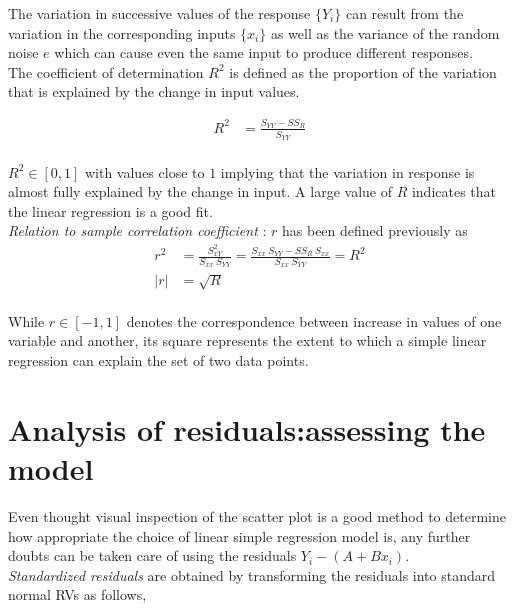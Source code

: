 The variation in successive values of the response $ \{Y_i\} $ can result from the variation in the corresponding inputs $ \{x_i\} $ as well as the variance of the random noise $ e $ which can cause even the same input to produce different responses.\\

The coefficient of determination $ R^2 $ is defined as the proportion of the variation that is explained by the change in input values.

\begin{align}
	R^2 &= \frac{S_{YY} - SS_R}{S_{YY}}
\end{align}\\

$ R^2 \in [0, 1] $ with values close to $ 1 $ implying that the variation in response is almost fully explained by the change in input. A large value of $ R $ indicates that the linear regression is a good fit.\\


\textit{Relation to sample correlation coefficient} : $ r $ has been defined previously as \\

\begin{align}
	r^2 &= \frac{S^2_{xY}}{S_{xx}\ S_{YY}} = \frac{S_{xx} \ S_{YY} - SS_R \ S_{xx}}{S_{xx}\ S_{YY}} = R^2 \\
	|r| &= \sqrt{R}
\end{align}\\

While $ r \in [-1, 1] $ denotes the correspondence between increase in values of one variable and another, its square represents the extent to which a simple linear regression can explain the set of two data points.\\

\section{Analysis of residuals:assessing the model}

Even thought visual inspection of the scatter plot is a good method to determine how appropriate the choice of linear simple regression model is, any further doubts can be taken care of using the residuals $ Y_i - (A + B x_i) $.\\

\textit{Standardized residuals} are obtained by transforming the residuals into standard normal RVs as follows,\\

